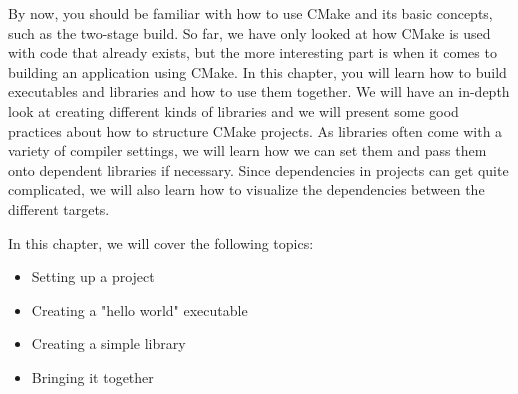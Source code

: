 By now, you should be familiar with how to use CMake and its basic concepts, such as the two-stage build. So far, we have only looked at how CMake is used with code that already exists, but the more interesting part is when it comes to building an application using CMake. In this chapter, you will learn how to build executables and libraries and how to use them together. We will have an in-depth look at creating different kinds of libraries and we will present some good practices about how to structure CMake projects. As libraries often come with a variety of compiler settings, we will learn how we can set them and pass them onto dependent libraries if necessary. Since dependencies in projects can get quite complicated, we will also learn how to visualize the dependencies between the different targets.

In this chapter, we will cover the following topics:

\begin{itemize}
\item 
Setting up a project

\item 
Creating a "hello world" executable

\item 
Creating a simple library

\item 
Bringing it together
\end{itemize}
